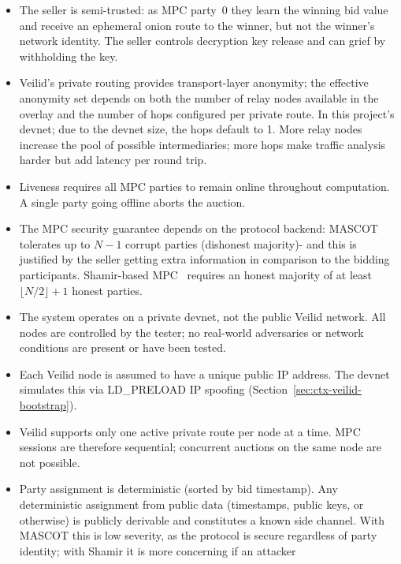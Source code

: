 \begin{itemize}[noitemsep]
  \item The seller is semi-trusted: as MPC party~0 they learn the winning bid
    value and receive an ephemeral onion route to the winner, but not the
    winner's network identity.  The seller controls decryption key release
    and can grief by withholding the key.
  \item Veilid's private routing provides transport-layer anonymity; the
    effective anonymity set depends on both the number of relay nodes
    available in the overlay and the number of hops configured per
    private route. In this project's devnet; due to the devnet size, the hops default to 1.  More relay nodes increase the pool
    of possible intermediaries; more hops make traffic analysis harder
    but add latency per round trip.
  \item Liveness requires all MPC parties to remain online throughout
    computation.  A single party going offline aborts the auction.
  \item The MPC security guarantee depends on the protocol backend:
    MASCOT~\cite{keller2016_mascot} tolerates up to $N{-}1$ corrupt parties
    (dishonest majority)- and this is justified by the seller getting extra information in comparison to the bidding participants.
    Shamir-based MPC~\cite{shamir1979_secret_sharing, evans2018_pragmatic_mpc}
    requires an honest majority of at least $\lfloor N/2 \rfloor + 1$ honest
    parties.
  \item The system operates on a private devnet, not the public Veilid
    network.  All nodes are controlled by the tester; no real-world
    adversaries or network conditions are present or have been tested.
  \item Each Veilid node is assumed to have a unique public IP address.
    The devnet simulates this via LD\_PRELOAD IP spoofing
    (Section~\ref{sec:ctx-veilid-bootstrap}).
  \item Veilid supports only one active private route per node at a time.
    MPC sessions are therefore sequential; concurrent auctions on the same
    node are not possible.
  \item Party assignment is deterministic (sorted by bid timestamp).
    Any deterministic assignment from public data (timestamps, public keys,
    or otherwise) is publicly derivable and constitutes a known side channel.
    With MASCOT this is low severity, as the protocol is secure regardless
    of party identity; with Shamir it is more concerning if an attacker

\end{itemize}
